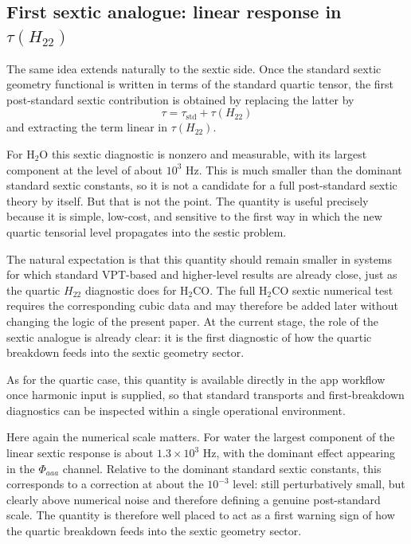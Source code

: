 \documentclass[journal=jacsat,manuscript=article]{achemso}
\begin{document}
\subsection{First sextic analogue: linear response in \texorpdfstring{$\tau(H_{22})$}{tau(H22)}}

The same idea extends naturally to the sextic side. Once the standard sextic
geometry functional is written in terms of the standard quartic tensor, the
first post-standard sextic contribution is obtained by replacing the latter by
\begin{equation}
\tau = \tau_{\mathrm{std}} + \tau(H_{22})
\end{equation}
and extracting the term linear in $\tau(H_{22})$.

For H$_2$O this sextic diagnostic is nonzero and measurable, with its largest
component at the level of about $10^3$ Hz. This is much smaller than the
dominant standard sextic constants, so it is not a candidate for a full
post-standard sextic theory by itself. But that is not the point. The
quantity is useful precisely because it is simple, low-cost, and sensitive to
the first way in which the new quartic tensorial level propagates into the
sestic problem.

The natural expectation is that this quantity should remain smaller in systems
for which standard VPT-based and higher-level results are already close, just
as the quartic $H_{22}$ diagnostic does for H$_2$CO. The full H$_2$CO sextic
numerical test requires the corresponding cubic data and may therefore be
added later without changing the logic of the present paper. At the current
stage, the role of the sextic analogue is already clear: it is the first
diagnostic of how the quartic breakdown feeds into the sextic geometry sector.

As for the quartic case, this quantity is available directly in the app
workflow once harmonic input is supplied, so that standard transports and
first-breakdown diagnostics can be inspected within a single operational
environment.

Here again the numerical scale matters. For water the largest component of the
linear sextic response is about $1.3\times 10^3$ Hz, with the dominant effect
appearing in the $\Phi_{aaa}$ channel. Relative to the dominant standard
sextic constants, this corresponds to a correction at about the $10^{-3}$
level: still perturbatively small, but clearly above numerical noise and
therefore defining a genuine post-standard scale. The quantity is therefore
well placed to act as a first warning sign of how the quartic breakdown feeds
into the sextic geometry sector.
\end{document}
